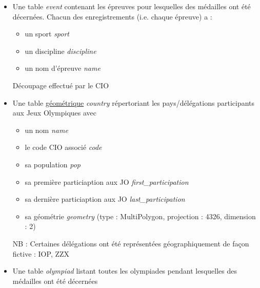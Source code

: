 \documentclass{article}
\begin{document}
\begin{itemize}

\item
Une table \textit{event} contenant les épreuves pour lesquelles des médailles ont été décernées. Chacun des enregistrements (i.e. chaque épreuve) a :

\begin{itemize}

\item un sport \textit{sport}

\item un discipline \textit{discipline}

\item un nom d'épreuve \textit{name}

\end{itemize}

{\footnotesize Découpage effectué par le CIO}

\item
Une table \underline{géométrique} \textit{country} répertoriant les pays/délégations participants aux Jeux Olympiques avec

\begin{itemize}

\item un nom \textit{name}

\item le code CIO associé \textit{code}

\item sa population \textit{pop}

\item sa première particiaption aux JO \textit{first\_participation}

\item sa dernière particiaption aux JO \textit{last\_participation}

\item sa géométrie \textit{geometry} {\footnotesize (type : MultiPolygon, projection : 4326, dimension : 2) }

\end{itemize}

{\footnotesize NB : Certaines délégations ont été représentées géographiquement de façon fictive : IOP, ZZX}

\item
Une table \textit{olympiad} listant toutes les olympiades pendant lesquelles des médailles ont été décernées

\begin{itemize}


\end{itemize}
\end{itemize}
\end{document}
